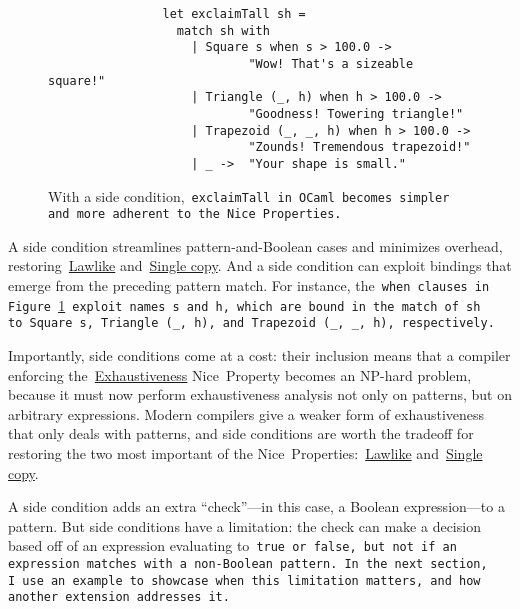 \documentclass[manuscript,screen 12pt, nonacm]{acmart}
\begin{document}
        \begin{figure}[]
            \begin{verbatim}
                let exclaimTall sh =
                  match sh with 
                    | Square s when s > 100.0 ->
                            "Wow! That's a sizeable square!"
                    | Triangle (_, h) when h > 100.0 ->
                            "Goodness! Towering triangle!"
                    | Trapezoid (_, _, h) when h > 100.0 -> 
                            "Zounds! Tremendous trapezoid!"
                    | _ ->  "Your shape is small." 
                \end{verbatim}
            \caption{With a side condition,~\tt{exclaimTall} in OCaml becomes
            simpler and more adherent to the Nice~Properties.} 
            \label{fig:whenexclaimtall}
        \end{figure}

    A side condition streamlines pattern-and-Boolean cases and minimizes
    overhead, restoring~\hyperref[p1]{Lawlike} and~\hyperref[p2]{Single copy}.
    And a side condition can exploit bindings that emerge from the preceding
    pattern match. For instance, the~\tt{when} clauses in
    Figure~\ref{fig:whenexclaimtall} exploit names~\tt{s} and~\tt{h}, which are
    bound in the match of~\tt{sh} to~\tt{Square s},~\tt{Triangle (\_, h)}, and
    \tt{Trapezoid (\_,~\_, h)}, respectively. 

    Importantly, side conditions come at a cost: their inclusion means that a
    compiler enforcing the~\hyperref[p5]{Exhaustiveness} Nice~Property becomes
    an NP-hard problem, because it must now perform exhaustiveness analysis not
    only on patterns, but on arbitrary expressions. Modern compilers give a
    weaker form of exhaustiveness that only deals with patterns, and side
    conditions are worth the tradeoff for restoring the two most important of
    the Nice~Properties:~\hyperref[p1]{Lawlike} and~\hyperref[p2]{Single copy}.

    A side condition adds an extra “check”---in this case, a Boolean
    expression---to a pattern. But side conditions have a limitation: the check
    can make a decision based off of an expression evaluating to~\tt{true} or
    \tt{false}, but not if an expression matches with a non-Boolean pattern. In
    the next section, I~use an example to~showcase when this limitation matters,
    and how another extension addresses it. 
\end{document}
